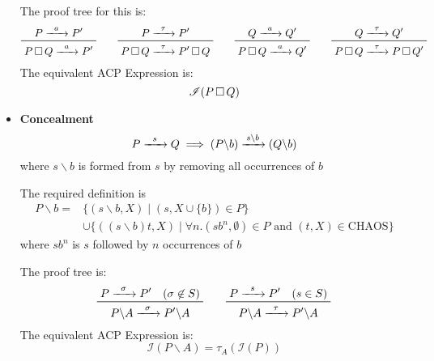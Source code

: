 \documentclass{article}
\begin{document}
\begin{itemize}
    The proof tree for this is:
    \[\prftree{P \prightarrow{a} P'}{P \detcomp Q \prightarrow{a} P'} \qquad \prftree{P \prightarrow{\tau} P'}{P \detcomp Q \prightarrow{\tau} P' \detcomp Q} \qquad \prftree{Q \prightarrow{a} Q'}{P \detcomp Q \prightarrow{a} Q'} \qquad \prftree{Q \prightarrow{\tau} Q'}{P \detcomp Q \prightarrow{\tau} P \detcomp Q'}\]
    The equivalent ACP Expression is:
    \[\mathscr{I}(P \,\square\, Q)\]
\item \textbf{Concealment}
    \[P \prightarrow{s} Q \implies (P \backslash b) \prightarrow{s\backslash b}(Q \backslash b)\]
    where $s \backslash b$ is formed from $s$ by removing all occurrences of $b$
    
    The required definition is
    \begin{align*}
        P \backslash b = & \{(s \backslash b, X) \mid (s, X \cup \{b\})\in P\}\\
                         &\cup \{((s \backslash b) t, X) \mid \forall n.(sb^{n}, \emptyset)\in P \text{ and } (t, X)\in \mathrm{CHAOS}\}
    \end{align*}
    where $sb^{n}$ is $s$ followed by $n$ occurrences of $b$

    The proof tree is:
    \[\prftree{P \prightarrow{\sigma} P' \quad (\sigma\not\in S)}{P \backslash A \prightarrow{\sigma} P' \backslash A} \qquad \prftree{P \prightarrow{s} P' \quad (s\in S)}{P \backslash A \prightarrow{\tau} P' \backslash A}\]
    The equivalent ACP Expression is:
    \[\mathscr{I}(P \backslash A) = \tau_{A} (\mathscr{I}(P))\]
\end{itemize}
\end{document}
